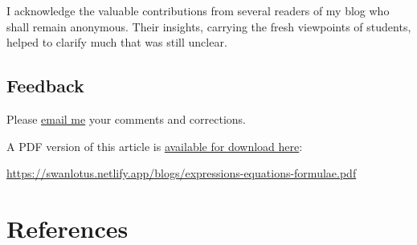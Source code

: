 \documentclass[
  a4paper,
]{article}
\begin{document}
I acknowledge the valuable contributions from several readers of my blog
who shall remain anonymous. Their insights, carrying the fresh
viewpoints of students, helped to clarify much that was still unclear.

\subsection{Feedback}\label{feedback}

Please \href{mailto:feedback.swanlotus@gmail.com}{email me} your
comments and corrections.

\noindent A PDF version of this article is
\href{./expressions-equations-formulae.pdf}{available for download
here}:

\begin{small}

\begin{sffamily}

\url{https://swanlotus.netlify.app/blogs/expressions-equations-formulae.pdf}

\end{sffamily}

\end{small}

\section*{References}\label{bibliography}
\end{document}

